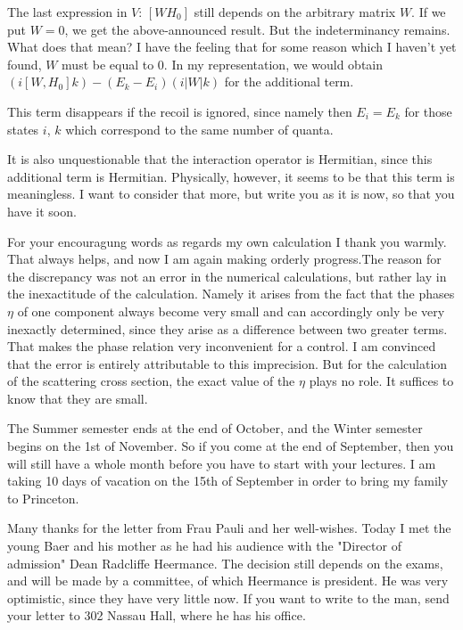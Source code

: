 The last expression in $V$: $[WH_0]$ still depends on the arbitrary matrix $W$. If we put $W=0$, we get the above-announced result. But the indeterminancy remains. What does that mean? I have the feeling that for some reason which I haven't yet found, $W$ must be equal to 0. In my representation, we would obtain $(i[W, H_0]k) - (E_k - E_i)(i|W|k)$ for the additional term.

This term disappears if the recoil is ignored, since namely then $E_i=E_k$ for those states $i$, $k$ which correspond to the same number of quanta.

It is also unquestionable that the interaction operator is Hermitian, since this additional term is Hermitian. Physically, however, it seems to be that this term is meaningless.  I want to consider that more, but write you as it is now, so that you have it soon.

For your encouragung words as regards my own calculation I thank you warmly. That always helps, and now I am again making orderly progress.The reason for the discrepancy was not an error in the numerical calculations, but rather lay in the inexactitude of the calculation. Namely it arises from the fact that the phases $\eta$ of one component always become very small and can accordingly only be very inexactly determined, since they arise as a difference between two greater terms. That makes the phase relation very inconvenient for a control. I am convinced that the error is entirely attributable to this imprecision. But for the calculation of the scattering cross section, the exact value of the $\eta$ plays no role. It suffices to know that they are small.

The Summer semester ends at the end of October, and the Winter semester begins on the 1st of November. So if you come at the end of September, then you will still have a whole month before you have to start with your lectures. I am taking 10 days of vacation on the 15th of September in order to bring my family to Princeton.

Many thanks for the letter from Frau Pauli and her well-wishes. Today I met the young Baer and his mother as he had his audience with the "Director of admission" Dean Radcliffe Heermance. The decision still depends on the exams, and will be made by a committee, of which Heermance is president. He was very optimistic, since they have very little  now. If you want to write to the man, send your letter to 302 Nassau Hall, where he has his office.

